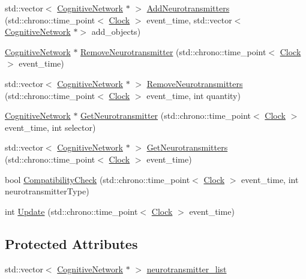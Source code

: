 \begin{DoxyCompactItemize}
\item 
std\+::vector$<$ \hyperlink{class_cognitive_network}{Cognitive\+Network} $\ast$ $>$ \hyperlink{class_neuroreceptor_a2e4cbd9debd555091923f57f8aa11fe4}{Add\+Neurotransmitters} (std\+::chrono\+::time\+\_\+point$<$ \hyperlink{universe_8h_a0ef8d951d1ca5ab3cfaf7ab4c7a6fd80}{Clock} $>$ event\+\_\+time, std\+::vector$<$ \hyperlink{class_cognitive_network}{Cognitive\+Network} $\ast$$>$ add\+\_\+objects)
\item 
\hyperlink{class_cognitive_network}{Cognitive\+Network} $\ast$ \hyperlink{class_neuroreceptor_a7e94ac827de7abbac585639edfd4f985}{Remove\+Neurotransmitter} (std\+::chrono\+::time\+\_\+point$<$ \hyperlink{universe_8h_a0ef8d951d1ca5ab3cfaf7ab4c7a6fd80}{Clock} $>$ event\+\_\+time)
\item 
std\+::vector$<$ \hyperlink{class_cognitive_network}{Cognitive\+Network} $\ast$ $>$ \hyperlink{class_neuroreceptor_ad760106ce6194ac02959c1882bd0f327}{Remove\+Neurotransmitters} (std\+::chrono\+::time\+\_\+point$<$ \hyperlink{universe_8h_a0ef8d951d1ca5ab3cfaf7ab4c7a6fd80}{Clock} $>$ event\+\_\+time, int quantity)
\item 
\hyperlink{class_cognitive_network}{Cognitive\+Network} $\ast$ \hyperlink{class_neuroreceptor_a526d41738265399c19c67068db450851}{Get\+Neurotransmitter} (std\+::chrono\+::time\+\_\+point$<$ \hyperlink{universe_8h_a0ef8d951d1ca5ab3cfaf7ab4c7a6fd80}{Clock} $>$ event\+\_\+time, int selector)
\item 
std\+::vector$<$ \hyperlink{class_cognitive_network}{Cognitive\+Network} $\ast$ $>$ \hyperlink{class_neuroreceptor_a4267220ee11105b7628bf39049ef7cc5}{Get\+Neurotransmitters} (std\+::chrono\+::time\+\_\+point$<$ \hyperlink{universe_8h_a0ef8d951d1ca5ab3cfaf7ab4c7a6fd80}{Clock} $>$ event\+\_\+time)
\item 
bool \hyperlink{class_neuroreceptor_a5d54ca353f0be78522aacc4fca06db63}{Compatibility\+Check} (std\+::chrono\+::time\+\_\+point$<$ \hyperlink{universe_8h_a0ef8d951d1ca5ab3cfaf7ab4c7a6fd80}{Clock} $>$ event\+\_\+time, int neurotransmitter\+Type)
\item 
int \hyperlink{class_neuroreceptor_ab8f288a095fb028793e7246a42de233b}{Update} (std\+::chrono\+::time\+\_\+point$<$ \hyperlink{universe_8h_a0ef8d951d1ca5ab3cfaf7ab4c7a6fd80}{Clock} $>$ event\+\_\+time)
\end{DoxyCompactItemize}
\subsection*{Protected Attributes}
\begin{DoxyCompactItemize}
\item 
std\+::vector$<$ \hyperlink{class_cognitive_network}{Cognitive\+Network} $\ast$ $>$ \hyperlink{class_neuroreceptor_aeb769732421531614a47bcab8ae21f8e}{neurotransmitter\+\_\+list}
\end{DoxyCompactItemize}
